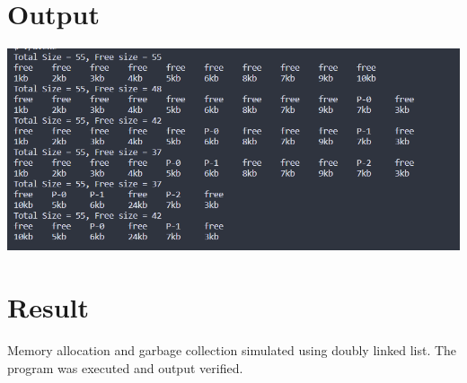 \section{Output}
\includegraphics[width=\textwidth]{Cycle_2/Outputs/MemoryAlloc.png}

\section{Result}
Memory allocation and garbage collection simulated using doubly linked list. The program
was executed and output verified.

